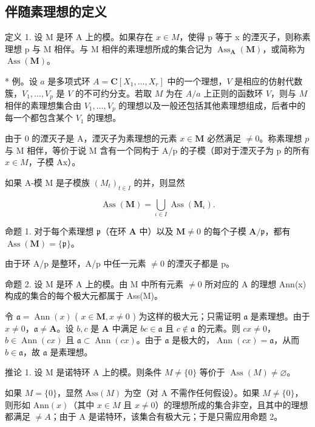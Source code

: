 \subsection{伴随素理想的定义}

定义 1. 设 M 是环 A 上的模。如果存在 \(x \in M\)，使得 p 等于 x 的湮灭子，则称素理想 p 与 M 相伴。与 M 相伴的素理想所成的集合记为 \(\operatorname{Ass}_{\mathbf{A}}(\mathbf{M})\)，或简称为 \(\operatorname{Ass}(\mathbf{M})\)。

* 例。设 \(a\) 是多项式环 \(A = \mathbf{C}[X_1, \ldots, X_r]\) 中的一个理想，\(V\) 是相应的仿射代数簇，\(V_1, \ldots, V_p\) 是 \(V\) 的不可约分支。若取 \(M\) 为在 \(A/a\) 上正则的函数环 \(V\)，则与 \(M\) 相伴的素理想集合由 \(V_1, \ldots, V_p\) 的理想以及一般还包括其他素理想组成，后者中的每一个都包含某个 \(V_1\) 的理想。

由于 0 的湮灭子是 A，湮灭子为素理想的元素 \(x \in \mathbf{M}\) 必然满足 \(\neq 0\)。称素理想 \(p\) 与 M 相伴，等价于说 M 含有一个同构于 A/p 的子模（即对于湮灭子为 p 的所有 \(x \in M\)，子模 Ax）。

如果 A-模 M 是子模族 \((M_{t})_{t\in I}\) 的并，则显然

\[
\operatorname{Ass} (\mathbf {M}) = \bigcup_ {\iota \in I} \operatorname{Ass} \left(\mathbf {M} _ {\iota}\right).\tag{1}
\]

命题 1. 对于每个素理想 \(\mathfrak{p}\)（在环 \(\mathbf{A}\) 中）以及 \(\mathbf{M} \neq 0\) 的每个子模 \(\mathbf{A} / \mathfrak{p}\)，都有 \(\operatorname{Ass}(\mathbf{M}) = \{\mathfrak{p}\}\)。

由于环 A/p 是整环，A/p 中任一元素 \(\neq0\) 的湮灭子都是 p。

命题 2. 设 M 是环 A 上的模。由 M 中所有元素 \(\neq0\) 所对应的 A 的理想 Ann(x) 构成的集合的每个极大元都属于 Ass(M)。

令 \(\mathfrak{a} = \operatorname{Ann}(x)\) ( \(x \in \mathbf{M}, x \neq 0\) ) 为这样的极大元；只需证明 \(\mathfrak{a}\) 是素理想。由于 \(x \neq 0\)，\(\mathfrak{a} \neq \mathbf{A}\)。设 \(b, c\) 是 \(\mathbf{A}\) 中满足 \(bc \in \mathfrak{a}\) 且 \(c \notin \mathfrak{a}\) 的元素。则 \(cx \neq 0\)，\(b \in \operatorname{Ann}(cx)\) 且 \(\mathfrak{a} \subset \operatorname{Ann}(cx)\)。由于 \(\mathfrak{a}\) 是极大的，\(\operatorname{Ann}(cx) = \mathfrak{a}\)，从而 \(b \in \mathfrak{a}\)，故 \(\mathfrak{a}\) 是素理想。

推论 1. 设 M 是诺特环 A 上的模。则条件 \(M \neq \{0\}\) 等价于 \(\operatorname{Ass}(M) \neq \varnothing\)。

如果 \(M = \{0\}\)，显然 \(\text{Ass}(M)\) 为空（对 A 不需作任何假设）。如果 \(M \neq \{0\}\)，则形如 \(\text{Ann}(x)\)（其中 \(x \in M\) 且 \(x \neq 0\)）的理想所成的集合非空，且其中的理想都满足 \(\neq A\)；由于 A 是诺特环，该集合有极大元；于是只需应用命题 2。

